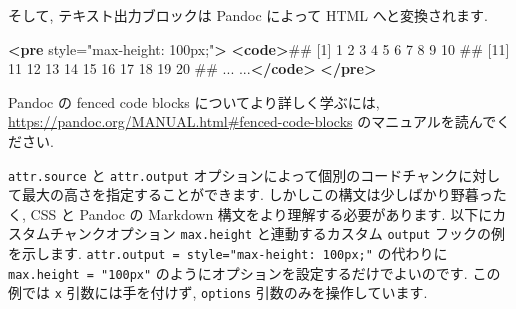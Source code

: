 \documentclass[
  11pt,
  lualatex,
  ja=standard]{bxjsreport}
\newenvironment{Shaded}{\begin{snugshade}}{\end{snugshade}}
\newcommand{\KeywordTok}[1]{\textcolor[rgb]{0.13,0.29,0.53}{\textbf{#1}}}
\newcommand{\NormalTok}[1]{#1}
\newcommand{\OtherTok}[1]{\textcolor[rgb]{0.56,0.35,0.01}{#1}}
\newcommand{\StringTok}[1]{\textcolor[rgb]{0.31,0.60,0.02}{#1}}
\begin{document}
そして, テキスト出力ブロックは Pandoc によって HTML へと変換されます.

\begin{Shaded}
\begin{Highlighting}[]
\KeywordTok{\textless{}pre}\OtherTok{ style=}\StringTok{"max{-}height: 100px;"}\KeywordTok{\textgreater{}}
\KeywordTok{\textless{}code\textgreater{}}\NormalTok{\#\#   [1]   1   2   3   4   5   6   7   8   9  10}
\NormalTok{\#\#  [11]  11  12  13  14  15  16  17  18  19  20}
\NormalTok{\#\#  ... ...}\KeywordTok{\textless{}/code\textgreater{}}
\KeywordTok{\textless{}/pre\textgreater{}}
\end{Highlighting}
\end{Shaded}

Pandoc の fenced code blocks についてより詳しく学ぶには, \url{https://pandoc.org/MANUAL.html\#fenced-code-blocks} のマニュアルを読んでください.

\texttt{attr.source} と \texttt{attr.output} オプションによって個別のコードチャンクに対して最大の高さを指定することができます. しかしこの構文は少しばかり野暮ったく, CSS と Pandoc の Markdown 構文をより理解する必要があります. 以下にカスタムチャンクオプション \texttt{max.height} と連動するカスタム \texttt{output} フックの例を示します. \texttt{attr.output = \textquotesingle{}style="max-height:\ 100px;"\textquotesingle{}} の代わりに \texttt{max.height = "100px"} のようにオプションを設定するだけでよいのです. この例では \texttt{x} 引数には手を付けず, \texttt{options} 引数のみを操作しています.
\end{document}
